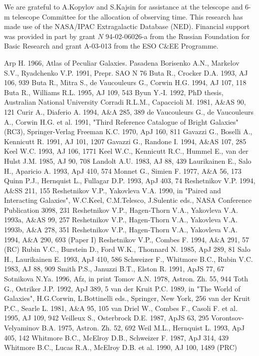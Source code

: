 \acknowledgements 
{We are grateful to A.Kopylov and S.Kajsin for 
assistance at the telescope
and 6-m telescope Committee for the allocation of observing time.
This research has made use of the NASA/IPAC Extragalactic
Database (NED). 
Financial support was provided in part by
grant $N$ 94-02-06026-a from the Russian Foundation for
Basic Research and grant A-03-013 from the 
ESO C$\&$EE Programme.}



\begin{thebibliography}{}

\bibitem{} Arp H. 1966, Atlas of Peculiar Galaxies. Pasadena
\bibitem{} Borisenko A.N., Markelov S.V., Ryadchenko V.P. 1991, Prepr. 
SAO N 76
\bibitem{} Buta R., Crocker D.A. 1993, AJ 106, 939
\bibitem{} Buta R., Mitra S., de Vaucouleurs G., Corwin H.G.
1994, AJ 107, 118
\bibitem{} Buta R., Williams R.L. 1995, AJ 109, 543
\bibitem{} Byun Y.-I. 1992, PhD thesis, Australian National University
\bibitem{} Corradi R.L.M., Capaccioli M. 1981, A\&AS 90, 121
\bibitem{} Curir A., Diaferio A. 1994, A\&A 285, 389
\bibitem{} de Vaucouleurs G., de Vaucouleurs A., Corwin H.G. et al. 1991, 
"Third Reference Catalogue of Bright Galaxies" (RC3),
Springer-Verlag 
\bibitem{} Freeman K.C. 1970, ApJ 160, 811
\bibitem{} Gavazzi G., Boselli A., Kennicutt R. 1991, AJ 101, 1207 
\bibitem{} Gavazzi G., Randone I. 1994, A\&AS 107, 285
\bibitem{} Keel W.C. 1993, AJ 106, 1771
\bibitem{} Keel W.C., Kennicutt R.C., Hummel E., van der Hulst J.M. 1985,
AJ 90, 708
\bibitem{} Landolt A.U. 1983, AJ 88, 439
\bibitem{} Laurikainen E., Salo H., Aparicio A. 1993, ApJ 410, 574
\bibitem{} Monnet G., Simien F. 1977, A\&A 56, 173
\bibitem{} Quinn P.J., Hernquist L., Fullagar D.P. 1993, ApJ 403, 74
\bibitem{} Reshetnikov V.P. 1994, A\&SS 211, 155
\bibitem{} Reshetnikov V.P., Yakovleva V.A. 1990, in "Paired and
Interacting Galaxies", W.C.Keel, C.M.Telesco, J.Sulentic eds.,
NASA Conference Publication 3098, 231
\bibitem{} Reshetnikov V.P., Hagen-Thorn V.A., Yakovleva V.A.
1993a, A\&AS 99, 257
\bibitem{} Reshetnikov V.P., Hagen-Thorn V.A., Yakovleva V.A.
1993b, A\&A 278, 351
\bibitem{} Reshetnikov V.P., Hagen-Thorn V.A., Yakovleva V.A.
1994, A\&A 290, 693 (Paper I)
\bibitem{} Reshetnikov V.P., Combes F. 1994, A\&A 291, 57 (RC)
\bibitem{} Rubin V.C., Burstein D., Ford W.K., Thonnard N. 1985,
ApJ 289, 81
\bibitem{} Salo H., Laurikainen E. 1993, ApJ 410, 586
\bibitem{} Schweizer F., Whitmore B.C., Rubin V.C. 1983, AJ 88, 909
\bibitem{} Smith P.S., Januzzi B.T., Elston R. 1991, ApJS 77, 67
\bibitem{} Sotnikova N.Ya. 1996, Afz, in print
\bibitem{} Tomov A.N. 1978, Astron. Zh. 55, 944
\bibitem{} Toth G., Ostriker J.P. 1992, ApJ 389, 5
\bibitem{} van der Kruit P.C. 1989, in "The World of Galaxies",
H.G.Corwin, L.Bottinelli eds., Springer, New York, 256
\bibitem{} van der Kruit P.C., Searle L. 1981, A\&A 95, 105
\bibitem{} van Driel W., Combes F., Casoli F. et al. 1995, AJ 109, 942
\bibitem{} Veilleux S., Osterbrock D.E. 1987, ApJS 63, 295
\bibitem{} Vorontsov-Velyaminov B.A. 1975, Astron. Zh. 52, 692
\bibitem{} Weil M.L., Hernquist L. 1993, ApJ 405, 142
\bibitem{} Whitmore B.C., McElroy D.B., Schweizer F. 1987, ApJ 314, 439
\bibitem{} Whitmore B.C., Lucas R.A., McElroy D.B. et al. 1990, AJ 100, 
1489 (PRC)

\end{thebibliography}






